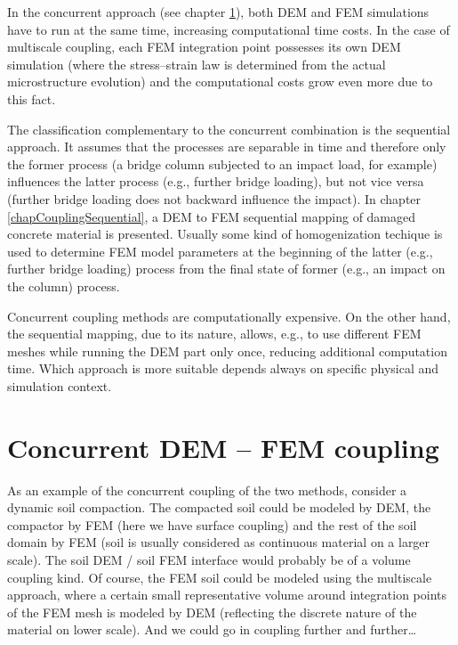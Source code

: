 In the concurrent approach (see chapter \ref{chapCouplingConcurent}), both DEM and FEM simulations have to run at the same time, increasing computational time costs.
In the case of multiscale coupling, each FEM integration point possesses its own DEM simulation (where the stress--strain law is determined from the actual microstructure evolution) and the computational costs grow even more due to this fact.

The classification complementary to the concurrent combination is the sequential approach.
It assumes that the processes are separable in time and therefore only the former process
(a bridge column subjected to an impact load, for example)
influences the latter process
(e.g., further bridge loading),
but not vice versa
(further bridge loading does not backward influence the impact).
In chapter \ref{chapCouplingSequential}, a DEM to FEM sequential mapping of damaged concrete material is presented.
Usually some kind of homogenization techique is used to determine FEM model parameters at the beginning of the latter
(e.g., further bridge loading)
process from the final state of former
(e.g., an impact on the column)
process.

Concurrent coupling methods are computationally expensive.
On the other hand, the sequential mapping, due to its  nature, allows, e.g., to use different FEM meshes while running the DEM part only once, reducing additional computation time.
Which approach is more suitable depends always on specific physical and simulation context.






\chapter{Concurrent DEM -- FEM coupling}\label{chapCouplingConcurent}

As an example of the concurrent coupling of the two methods, consider a dynamic soil compaction.
The compacted soil could be modeled by DEM, the compactor by FEM (here we have surface coupling) and the rest of the soil domain by FEM (soil is usually considered as continuous material on a larger scale).
The soil DEM / soil FEM interface would probably be of a volume coupling kind.
Of course, the FEM soil could be modeled using the multiscale approach, where a certain small representative volume around integration points of the FEM mesh is modeled by DEM (reflecting the discrete nature of the material on lower scale).
And we could go in coupling further and further\dots

